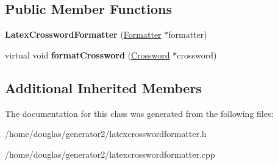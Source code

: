 \subsection*{Public Member Functions}
\begin{DoxyCompactItemize}
\item 
{\bfseries Latex\+Crossword\+Formatter} (\hyperlink{classFormatter}{Formatter} $\ast$formatter)\hypertarget{classLatexCrosswordFormatter_a7cdcf1ef94e921bed033a3cc56131ee9}{}\label{classLatexCrosswordFormatter_a7cdcf1ef94e921bed033a3cc56131ee9}

\item 
virtual void {\bfseries format\+Crossword} (\hyperlink{classCrossword}{Crossword} $\ast$crossword)\hypertarget{classLatexCrosswordFormatter_a91a60b95a134485842962bac1f4b8753}{}\label{classLatexCrosswordFormatter_a91a60b95a134485842962bac1f4b8753}

\end{DoxyCompactItemize}
\subsection*{Additional Inherited Members}


The documentation for this class was generated from the following files\+:\begin{DoxyCompactItemize}
\item 
/home/douglas/generator2/latexcrosswordformatter.\+h\item 
/home/douglas/generator2/latexcrosswordformatter.\+cpp\end{DoxyCompactItemize}
